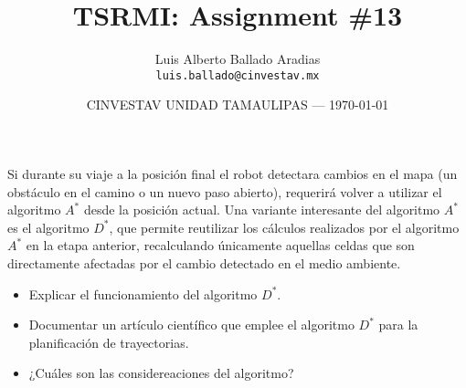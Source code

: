 \documentclass{article}
\title{TSRMI: Assignment \#13} %
\author{Luis Alberto Ballado Aradias\\ \texttt{luis.ballado@cinvestav.mx}} %
\date{CINVESTAV UNIDAD TAMAULIPAS --- \today} %
\begin{document}
\maketitle %


Si durante su viaje a la posición final el robot detectara cambios en el mapa (un obstáculo en el camino o un nuevo paso abierto), requerirá volver a utilizar el algoritmo $A^{*}$ desde la posición actual. Una variante interesante del algoritmo $A^{*}$ es el algoritmo $D^{*}$, que permite reutilizar los cálculos realizados por el algoritmo $A^{*}$ en la etapa anterior, recalculando únicamente aquellas celdas que son directamente afectadas por el cambio detectado en el medio ambiente.\\

\begin{itemize}
\item Explicar el funcionamiento del algoritmo $D^{*}$.
\item Documentar un artículo científico que emplee el algoritmo $D^{*}$ para la planificación de trayectorias.
\item ¿Cuáles son las considereaciones del algoritmo?
\end{itemize}
\end{document}
